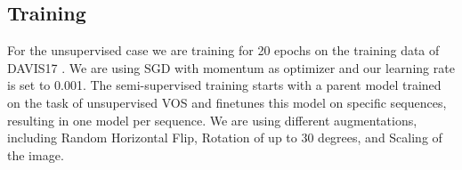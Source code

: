 \subsection{Training}
For the unsupervised case we are training for 20 epochs on the training data of DAVIS17 \cite{davis_2017}. We are using SGD with momentum as optimizer and our learning rate is set to 0.001. The semi-supervised training starts with a parent model trained on the task of unsupervised VOS and finetunes this model on specific sequences, resulting in one model per sequence. We are using different augmentations, including Random Horizontal Flip, Rotation of up to 30 degrees, and Scaling of the image.